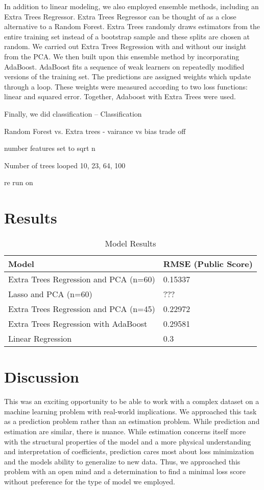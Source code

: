 \documentclass[11pt, oneside]{article}   	%
\begin{document}
In addition to linear modeling, we also employed ensemble methods, including an Extra Trees Regressor. Extra Trees Regressor can be thought of as a close alternative to a Random Forest. Extra Trees randomly draws estimators from the entire training set instead of a bootstrap sample and these splits are chosen at random. We carried out Extra Trees Regression with and without our insight from the PCA. We then built upon this ensemble method by incorporating AdaBoost. AdaBoost fits a sequence of weak learners on repeatedly modified versions of the training set. The predictions are assigned weights which update through a loop. These weights were measured according to two loss functions: linear and squared error. Together, Adaboost with Extra Trees were used.

Finally, we did classification --
Classification

Random Forest vs. Extra trees - vairance vs bias trade off

number features set to sqrt n 

Number of trees looped 10, 23, 64, 100

re run on 

\section{Results}

\begin{table}[]
\centering

\label{my-label}
\begin{tabular}{@{}ll@{}}
\toprule
\textbf{Model} & \textbf{RMSE (Public Score)} \\ \midrule
Extra Trees Regression and PCA (n=60)  & 0.15337  \\
Lasso and PCA (n=60)  & ???  \\
Extra Trees Regression and PCA (n=45)   & 0.22972  \\
Extra Trees Regression with AdaBoost  & 0.29581  \\
Linear Regression & 0.3  \\ \bottomrule
\end{tabular}
\caption{Model Results}
\end{table}

\section{Discussion}
This was an exciting opportunity to be able to work with a complex dataset on a machine learning problem with real-world implications. We approached this task as a prediction problem rather than an estimation problem. While prediction and estimation are similar, there is nuance. While estimation concerns itself more with the structural properties of the model and a more physical understanding and interpretation of coefficients, prediction cares most about loss minimization and the models ability to generalize to new data. Thus, we approached this problem with an open mind and a determination to find a minimal loss score without preference for the type of model we employed. 
\end{document}
